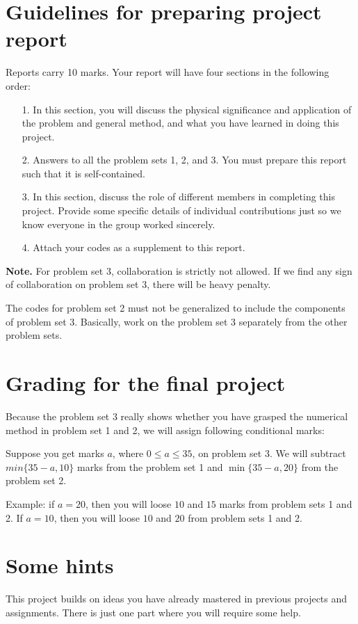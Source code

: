 \documentclass[11pt,a4paper]{article}
\begin{document}
\section{Guidelines for preparing project report} 
Reports carry 10 marks. Your report will have four sections in the following order:
\begin{itemize}
\item[1.] In this section, you will discuss the physical significance and application of the problem and general method, and what you have learned in doing this project.
\item[2.] Answers to all the problem sets 1, 2, and 3. You must prepare this report such that it is self-contained. 
\item[3.] In this section, discuss the role of different members in completing this project. Provide some specific details of individual contributions just so we know everyone in the group worked sincerely. 
\item[4.] Attach your codes as a supplement to this report.
\end{itemize}

{\color{red} {\bf Note.} For problem set 3, collaboration is strictly not allowed. If we find any sign of collaboration on problem set 3, there will be heavy penalty.

The codes for problem set 2 must not be generalized to include the components of problem set 3. Basically, work on the problem set 3 separately from the other problem sets. }


\section{Grading for the final project}
Because the problem set 3 really shows whether you have grasped the numerical method in problem set 1 and 2, we will assign following conditional marks:

Suppose you get marks $a$, where $0 \leq a \leq 35$, on problem set 3. We will subtract $min\{35 - a, 10\}$ marks from the problem set 1 and $\min\{35 - a, 20\}$ from the problem set 2. 

Example: if $a = 20$, then you will loose $10$ and $15$ marks from problem sets 1 and 2. If $ a = 10$, then you will loose $10$ and $20$ from problem sets 1 and 2.

\section{Some hints}
This project builds on ideas you have already mastered in previous projects and assignments. There is just one part where you will require some help. 
\end{document}
